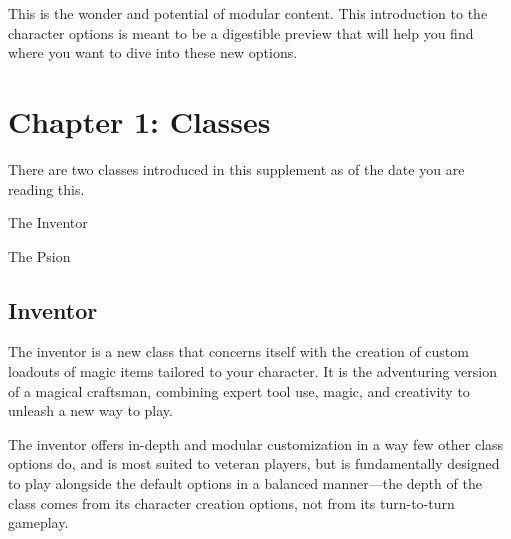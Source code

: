 \documentclass[11pt,twoside,openany]{book}  %
\begin{document}
This is the wonder and potential of modular content. This introduction to the character options is meant to be a digestible preview that will help you find where you want to dive into these new options.
\section*{Chapter 1: Classes}
There are two classes introduced in this supplement as of the date you are reading this. 
\begin{fiveitemize}
	\item The Inventor
	\item The Psion
\end{fiveitemize}
\subsection*{Inventor}
The inventor is a new class that concerns itself with the creation of custom loadouts of magic items tailored to your character. It is the adventuring version of a magical craftsman, combining expert tool use, magic, and creativity to unleash a new way to play.

The inventor offers in-depth and modular customization in a way few other class options do, and is most suited to veteran players, but is fundamentally designed to play alongside the default options in a balanced manner—the depth of the class comes from its character creation options, not from its turn-to-turn gameplay.
\end{document}
